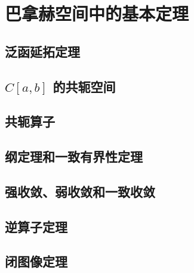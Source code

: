 \chapter{巴拿赫空间中的基本定理}
\section{泛函延拓定理}\label{sec:4.1}



\section{$C\left[ a,b \right]$ 的共轭空间}\label{sec:4.2}



\section{共轭算子}\label{sec:4.3}



\section{纲定理和一致有界性定理}\label{sec:4.4}



\section{强收敛、弱收敛和一致收敛}\label{sec:4.5}



\section{逆算子定理}\label{sec:4.6}



\section{闭图像定理}\label{sec:4.7}